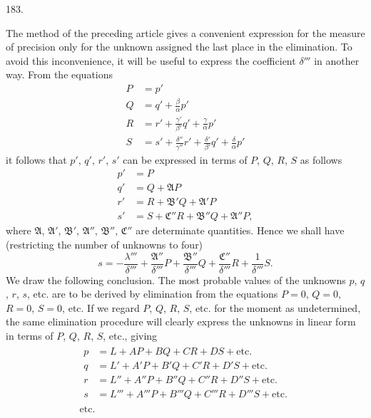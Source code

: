 \begin{center}\hypertarget{native-256-article183}{}183.\end{center}
The method of the preceding article gives a convenient expression for the measure of precision only for the unknown assigned the last place in the elimination. To avoid this inconvenience, it will be useful to express the coefficient $\delta'''$ in another way. From the equations
\[
\begin{aligned}
P&=p'\\
Q&=q'+\frac{\beta}{\alpha}p'\\
R&=r'+\frac{\gamma'}{\beta'}q'+\frac{\gamma}{\alpha}p'\\
S&=s'+\frac{\delta''}{\gamma''}r'+\frac{\delta'}{\beta'}q'+\frac{\delta}{\alpha}p'
\end{aligned}
\]
it follows that $p'$, $q'$, $r'$, $s'$ can be expressed in terms of $P$, $Q$, $R$, $S$ as follows
\[
\begin{aligned}
p'&=P\\
q'&=Q+\mathfrak{A}P\\
r'&=R+\mathfrak{B}'Q+\mathfrak{A}'P\\
s'&=S+\mathfrak{C}''R+\mathfrak{B}''Q+\mathfrak{A}''P,
\end{aligned}
\]
where $\mathfrak{A}$, $\mathfrak{A}'$, $\mathfrak{B}'$, $\mathfrak{A}''$, $\mathfrak{B}''$, $\mathfrak{C}''$ are determinate quantities. Hence we shall have (restricting the number of unknowns to four)
\[
s=-\frac{\lambda'''}{\delta'''}+\frac{\mathfrak{A}''}{\delta'''}P
+\frac{\mathfrak{B}''}{\delta'''}Q+\frac{\mathfrak{C}''}{\delta'''}R
+\frac{1}{\delta'''}S.
\]
We draw the following conclusion. The most probable values of the unknowns $p$, $q$, $r$, $s$, etc. are to be derived by elimination from the equations $P=0$, $Q=0$, $R=0$, $S=0$, etc. If we regard $P$, $Q$, $R$, $S$, etc. for the moment as undetermined, the same elimination procedure will clearly express the unknowns in linear form in terms of $P$, $Q$, $R$, $S$, etc., giving
\[
\begin{gathered}
\begin{aligned}
p&=L+AP+BQ+CR+DS+\text{etc.}\\
q&=L'+A'P+B'Q+C'R+D'S+\text{etc.}\\
r&=L''+A''P+B''Q+C''R+D''S+\text{etc.}\\
s&=L'''+A'''P+B'''Q+C'''R+D'''S+\text{etc.}
\end{aligned}\\
\text{etc.}
\end{gathered}
\]
